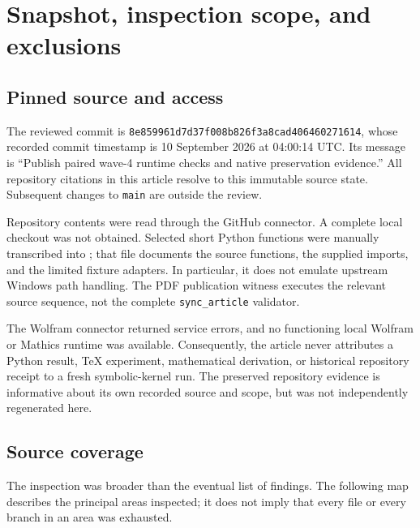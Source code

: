 \documentclass[11pt,letterpaper]{article}
\newcommand{\code}[1]{\nolinkurl{#1}}
\newcommand{\pin}{\texttt{8e859961d7d37f008b826f3a8cad406460271614}}
\begin{document}
\section{Snapshot, inspection scope, and exclusions}
\subsection{Pinned source and access}

The reviewed commit is \pin, whose recorded commit timestamp is
10 September 2026 at 04:00:14 UTC. Its message is ``Publish paired wave-4 runtime
checks and native preservation evidence.'' All repository citations in this
article resolve to this immutable source state. Subsequent changes to
\code{main} are outside the review.\cite{commit}

Repository contents were read through the GitHub connector. A complete local
checkout was not obtained. Selected short Python functions were manually
transcribed into ; that file documents the
source functions, the supplied imports, and the limited fixture adapters. In
particular, it does not emulate upstream Windows path handling. The PDF
publication witness executes the relevant source sequence, not the complete
\code{sync_article} validator.

The Wolfram connector returned service errors, and no functioning local
Wolfram or Mathics runtime was available. Consequently, the article never
attributes a Python result, TeX experiment, mathematical derivation, or
historical repository receipt to a fresh symbolic-kernel run. The preserved
repository evidence is informative about its own recorded source and scope,
but was not independently regenerated here.

\subsection{Source coverage}

The inspection was broader than the eventual list of findings. The following
map describes the principal areas inspected; it does not imply that every file
or every branch in an area was exhausted.
\end{document}

